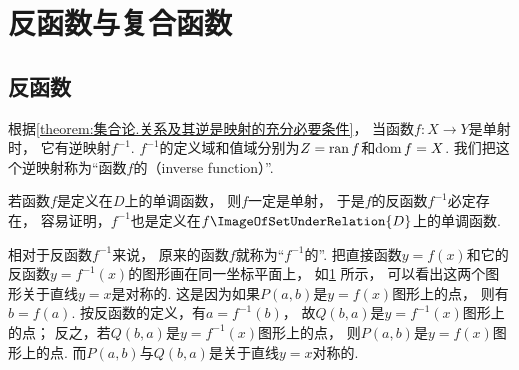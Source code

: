 \section{反函数与复合函数}
\subsection{反函数}
根据\cref{theorem:集合论.关系及其逆是映射的充分必要条件}，
当函数\(f\colon X \to Y\)是单射时，
它有逆映射\(f^{-1}\).
\(f^{-1}\)的定义域和值域分别为\(Z=\operatorname{ran} f\)和\(\operatorname{dom} f=X\).
我们把这个逆映射称为“函数\(f\)的（inverse function）”.

若函数\(f\)是定义在\(D\)上的单调函数，
则\(f\)一定是单射，
于是\(f\)的反函数\(f^{-1}\)必定存在，
容易证明，\(f^{-1}\)也是定义在\(f\ImageOfSetUnderRelation{D}\)上的单调函数.

相对于反函数\(f^{-1}\)来说，
原来的函数\(f\)就称为“\(f^{-1}\)的”.
把直接函数\(y=f(x)\)和它的反函数\(y=f^{-1}(x)\)的图形画在同一坐标平面上，
如\cref{figure:函数.直接函数与反函数的图形的对称性} 所示，
可以看出这两个图形关于直线\(y=x\)是对称的.
这是因为如果\(P(a,b)\)是\(y=f(x)\)图形上的点，
则有\(b=f(a)\).
按反函数的定义，有\(a=f^{-1}(b)\)，
故\(Q(b,a)\)是\(y=f^{-1}(x)\)图形上的点；
反之，若\(Q(b,a)\)是\(y=f^{-1}(x)\)图形上的点，
则\(P(a,b)\)是\(y=f(x)\)图形上的点.
而\(P(a,b)\)与\(Q(b,a)\)是关于直线\(y=x\)对称的.

\begin{figure}[htb]
	\centering
	\caption{}\label{figure:函数.直接函数与反函数的图形的对称性}
\end{figure}

